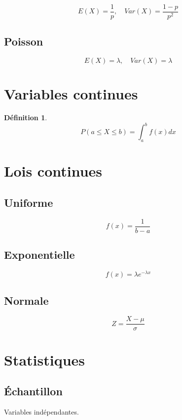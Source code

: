 \documentclass[11pt,a4paper]{article}
\newtheorem{definition}{Définition}
\begin{document}
\[
E(X)=\frac{1}{p},\quad Var(X)=\frac{1-p}{p^2}
\]

\subsection{Poisson}

\[
E(X)=\lambda,\quad Var(X)=\lambda
\]

\section{Variables continues}

\begin{definition}
\[
P(a \leq X \leq b)=\int_a^b f(x)dx
\]
\end{definition}

\section{Lois continues}

\subsection{Uniforme}

\[
f(x)=\frac{1}{b-a}
\]

\subsection{Exponentielle}

\[
f(x)=\lambda e^{-\lambda x}
\]

\subsection{Normale}

\[
Z=\frac{X-\mu}{\sigma}
\]

\section{Statistiques}

\subsection{Échantillon}

Variables indépendantes.
\end{document}
